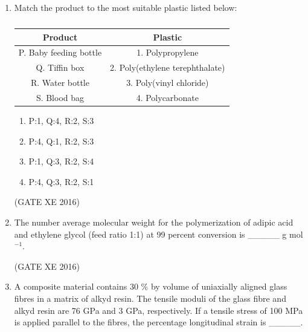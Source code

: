\documentclass[12pt]{article}
\begin{document}
\begin{enumerate}
\begin{multicols}{4}
\begin{enumerate}
\item 123.2
\item 133.2
\item 143.2
\item 153.2
\end{enumerate}
\end{multicols}
(GATE XE 2016)

\item Match the product to the most suitable plastic listed below:  

\begin{table}[H]
\centering
\begin{tabular}{|c|c|}
\hline
\textbf{Product} & \textbf{Plastic} \\ \hline
P. Baby feeding bottle & 1. Polypropylene \\ \hline
Q. Tiffin box & 2. Poly(ethylene terephthalate) \\ \hline
R. Water bottle & 3. Poly(vinyl chloride) \\ \hline
S. Blood bag & 4. Polycarbonate \\ \hline
\end{tabular}
\caption{}
\label{}
\end{table}

\begin{multicols}{2}
\begin{enumerate}
\item P:1, Q:4, R:2, S:3
\item P:4, Q:1, R:2, S:3
\item P:1, Q:3, R:2, S:4
\item P:4, Q:3, R:2, S:1
\end{enumerate}
\end{multicols}
(GATE XE 2016)

\item The number average molecular weight for the polymerization of adipic acid and ethylene glycol (feed ratio 1:1) at 99 percent conversion is \_\_\_\_\_ g mol$^{-1}$. 

(GATE XE 2016)

\item A composite material contains 30 \% by volume of uniaxially aligned glass fibres in a matrix of alkyd resin. The tensile moduli of the glass fibre and alkyd resin are 76 GPa and 3 GPa, respectively. If a tensile stress of 100 MPa is applied parallel to the fibres, the percentage longitudinal strain is \_\_\_\_\_. 


\end{enumerate}
\end{document}
